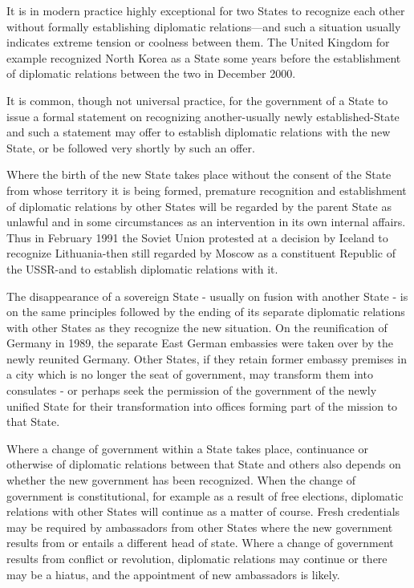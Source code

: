 \documentclass[
  openany]{book}
\begin{document}
It is in modern practice highly exceptional for two States to recognize each other without formally establishing diplomatic relations---and such a situation usually indicates extreme tension or coolness between them. The United Kingdom for example recognized North Korea as a State some years before the establishment of diplomatic relations between the two in December 2000.

It is common, though not universal practice, for the government of a State to issue a formal statement on recognizing another-usually newly established-State and such a statement may offer to establish diplomatic relations with the new State, or be followed very shortly by such an offer.

Where the birth of the new State takes place without the consent of the State from whose territory it is being formed, premature recognition and establishment of diplomatic relations by other States will be regarded by the parent State as unlawful and in some circumstances as an intervention in its own internal affairs. Thus in February 1991 the Soviet Union protested at a decision by Iceland to recognize Lithuania-then still regarded by Moscow as a constituent Republic of the USSR-and to establish diplomatic relations with it.

The disappearance of a sovereign State - usually on fusion with another State - is on the same principles followed by the ending of its separate diplomatic relations with other States as they recognize the new situation. On the reunification of Germany in 1989, the separate East German embassies were taken over by the newly reunited Germany. Other States, if they retain former embassy premises in a city which is no longer the seat of government, may transform them into consulates - or perhaps seek the permission of the government of the newly unified State for their transformation into offices forming part of the mission to that State.

Where a change of government within a State takes place, continuance or otherwise of diplomatic relations between that State and others also depends on whether the new government has been recognized. When the change of government is constitutional, for example as a result of free elections, diplomatic relations with other States will continue as a matter of course. Fresh credentials may be required by ambassadors from other States where the new government results from or entails a different head of state. Where a change of government results from conflict or revolution, diplomatic relations may continue or there may be a hiatus, and the appointment of new ambassadors is likely.
\end{document}
